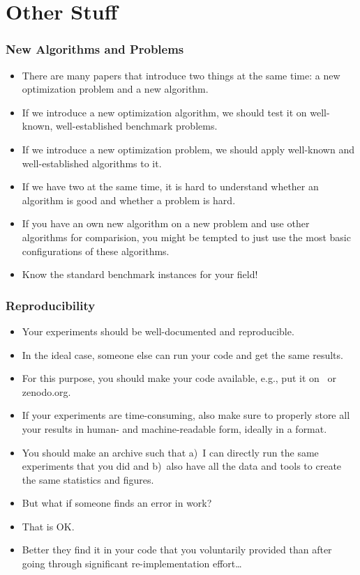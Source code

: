 \documentclass[aspectratio=169,mathserif,notheorems]{beamer}%
\begin{document}
\section{Other Stuff}%
%
\begin{frame}\frametitle{New Algorithms and Problems}%
\begin{itemize}%
\item There are many papers that introduce two things at the same time: a new optimization problem and a new algorithm.%
\item<3-> If we introduce a new optimization algorithm, we should test it on well-known, well-established benchmark problems.%
\item<5-> If we introduce a new optimization problem, we should apply well-known and well-established algorithms to it.%
\item<7-> If we have two  at the same time, it is hard to understand whether an algorithm is good and whether a problem is hard.%
\item<8-> If you have an own new algorithm on a new problem and use other algorithms for comparision, you might be tempted to just use the most basic configurations of these algorithms.%
\item<10> \alert{Know the standard benchmark instances for your field!}%
\end{itemize}%
\end{frame}%
%
\begin{frame}\frametitle{Reproducibility}%
\begin{itemize}%
\item Your experiments should be well-documented and reproducible.%
\item<2-> In the ideal case, someone else can run your code and get the same results.%
\item<3-> For this purpose, you should make your code available, e.g., put it on \github\ or zenodo.org.%
\item<4-> If your experiments are time-consuming, also make sure to properly store all your results in human- and machine-readable form, ideally in a  format.%
\item<5-> You should make an archive such that a)~I can directly run the same experiments that you did and b)~also have all the data and tools to create the same statistics and figures.%
\item<6-> \alert{But what if someone finds an error in work?}%
\item<7-> That is OK.%
\item<8-> Better they find it in your \alert{code} that you voluntarily provided than after going through significant re-implementation effort\dots%
\end{itemize}%
\end{frame}%
\end{document}
